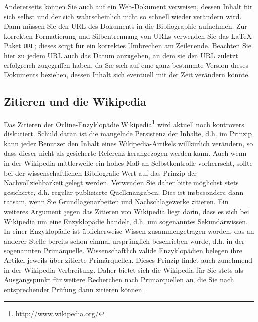 Andererseits können Sie auch auf ein Web-Dokument verweisen, dessen Inhalt für sich selbst und der sich wahrscheinlich nicht so schnell wieder verändern wird.
Dann müssen Sie den URL des Dokuments in die Bibliographie aufnehmen.
Zur korrekten Formatierung und Silbentrennung von URLs verwenden Sie das \LaTeX-Paket {\tt URL}; dieses sorgt für ein korrektes Umbrechen am Zeilenende.
Beachten Sie hier zu jedem URL auch das Datum anzugeben, an dem sie den URL zuletzt erfolgreich zugegriffen haben, da Sie sich auf eine ganz bestimmte Version dieses Dokuments beziehen, dessen Inhalt sich eventuell mit der Zeit verändern könnte.


\subsection{Zitieren und die Wikipedia}
Das Zitieren der Online-Enzyklopädie Wikipedia\footnote{http://www.wikipedia.org/} wird aktuell noch kontrovers diskutiert.
Schuld daran ist die mangelnde Persistenz der Inhalte, d.h. im Prinzip kann jeder Benutzer den Inhalt eines Wikipedia-Artikels willkürlich verändern, so dass dieser nicht als gesicherte Referenz herangezogen werden kann.
Auch wenn in der Wikipedia mittlerweile ein hohes Maß an Selbstkontrolle vorherrscht, sollte bei der wissenschaftlichen Bibliografie Wert auf das Prinzip der Nachvollziehbarkeit gelegt werden.
Verwenden Sie daher bitte möglichst stets gesicherte, d.h. regulär publizierte Quellenangaben.
Dies ist insbesondere dann ratsam, wenn Sie Grundlagenarbeiten und Nachschlagewerke zitieren.
Ein weiteres Argument gegen das Zitieren von Wikipedia liegt darin, dass es sich bei Wikipedia um eine Enzyklopädie handelt, d.h. um sogenanntes Sekundärwissen.
In einer Enzyklopädie ist üblicherweise Wissen zusammengetragen worden, das an anderer Stelle bereits schon einmal ursprünglich beschrieben wurde, d.h. in der sogenannten Primärquelle.
Wissenschaftlich valide Enzyklopädien belegen ihre Artikel jeweils über zitierte Primärquellen.
Dieses Prinzip findet auch zunehmend in der Wikipedia Verbreitung.
Daher bietet sich die Wikipedia für Sie stets als Ausgangspunkt für weitere Recherchen nach Primärquellen an, die Sie nach entsprechender Prüfung dann zitieren können.


